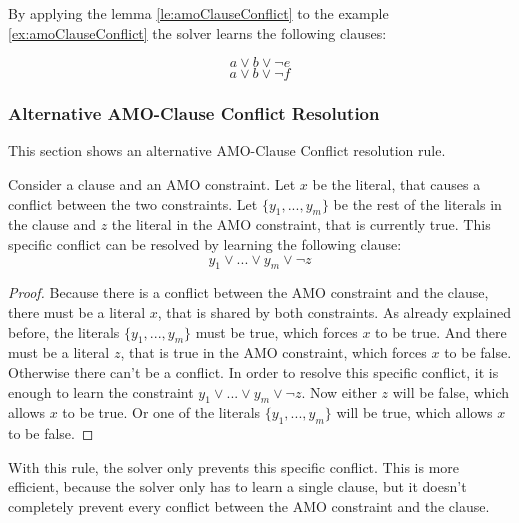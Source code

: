 By applying the lemma \ref{le:amoClauseConflict} to the example \ref{ex:amoClauseConflict} the solver learns the following clauses:

\begin{leftbar}
\begin{displaymath}
a \vee b \vee \neg e
\end{displaymath}
\begin{displaymath}
a \vee b \vee \neg f
\end{displaymath}
\end{leftbar}

\subsubsection{Alternative AMO-Clause Conflict Resolution}
This section shows an alternative AMO-Clause Conflict resolution rule.

\begin{lemma}
\begin{leftbar}
Consider a clause and an AMO constraint. Let $x$ be the literal, that causes a conflict between the two constraints. Let $\{y_1,...,y_m\}$ be the rest of the literals in the clause and $z$ the literal in the AMO constraint, that is currently true. This specific conflict can be resolved by learning the following clause:
\begin{displaymath}
y_1 \vee ... \vee y_m \vee \neg z
\end{displaymath}
\end{leftbar}
\end{lemma}

\begin{proof}
Because there is a conflict between the AMO constraint and the clause, there must be a literal $x$, that is shared by both constraints. As already explained before, the literals $\{y_1,...,y_m\}$ must be true, which forces $x$ to be true. And there must be a literal $z$, that is true in the AMO constraint, which forces $x$ to be false. Otherwise there can't be a conflict. In order to resolve this specific conflict, it is enough to learn the constraint $y_1 \vee ... \vee y_m \vee \neg z$. Now either $z$ will be false, which allows $x$ to be true. Or one of the literals $\{y_1,...,y_m\}$ will be true, which allows $x$ to be false.
\end{proof}

With this rule, the solver only prevents this specific conflict. This is more efficient, because the solver only has to learn a single clause, but it doesn't completely prevent every conflict between the AMO constraint and the clause.

